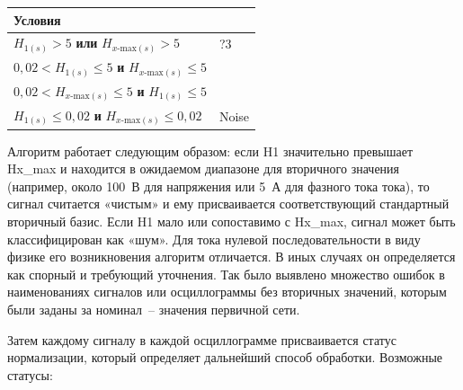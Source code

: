 \mbox{}\par\vspace{0.2cm}
{\small
\centering
\renewcommand{\arraystretch}{1.3}
\noindent
\begin{tabular}{|>{\centering\arraybackslash}p{340pt}|>{\centering\arraybackslash}p{80pt}|}
\hline
Условия &
\\ \hline
$H_{1(s)} > 5$ \textbf{или} $H_{x\text{-max}(s)} > 5$ &
?3 \\ \hline
$0{,}02 < H_{1(s)} \le 5$ \textbf{и} $H_{x\text{-max}(s)} \le 5$ &
\multirow{2}{*}{$IN_{\text{base}} = 1$} \\ \cline{1-1}
$0{,}02 < H_{x\text{-max}(s)} \le 5$ \textbf{и} $H_{1(s)} \le 5$ &
\\ \hline
$H_{1(s)} \le 0{,}02$ \textbf{и} $H_{x\text{-max}(s)} \le 0{,}02$ &
Noise \\ \hline
\end{tabular}
\par}
\vspace{0.3cm}


Алгоритм работает следующим образом: если H1 значительно превышает Hx\_max и находится в
ожидаемом диапазоне для вторичного значения (например, около 100~В для напряжения или
5~А для фазного тока тока), то сигнал считается «чистым» и ему присваивается
соответствующий стандартный вторичный базис. Если H1 мало или сопоставимо с Hx\_max,
сигнал может быть классифицирован как «шум». Для тока нулевой последовательности в виду
физике его возникновения алгоритм отличается. В иных случаях он определяется как спорный
и требующий уточнения. Так было выявлено множество ошибок в наименованиях сигналов или
осциллограммы без вторичных значений, которым были заданы за номинал~-- значения
первичной сети.

Затем каждому сигналу в каждой осциллограмме присваивается статус нормализации, который
определяет дальнейший способ обработки. Возможные статусы:

